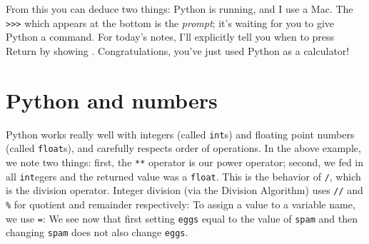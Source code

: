 \documentclass[m3380-lec-main.tex]{subfiles}
\begin{document}
From this you can deduce two things: Python is running, and I use a Mac. The \verb|>>>| which appears at the bottom is the \emph{prompt}; it's waiting for you to give Python a command. For today's notes, I'll explicitly tell you when to press Return by showing \car.
\smallskip\noindent
Congratulations, you've just used Python as a calculator! 


\section{Python and numbers}
Python works really well with integers (called \verb|int|s) and floating point numbers (called \verb|float|s), and carefully respects order of operations.
\smallskip\noindent
In the above example, we note two things: first, the \verb|**| operator is our power operator; second, we fed in all \verb|int|egers and the returned value was a \verb|float|. This is the behavior of \verb|/|, which is the division operator. Integer division (via the Division Algorithm) uses \verb|//| and \verb|%| for quotient and remainder respectively:
\smallskip\noindent
To assign a value to a variable name, we use \verb|=|:
\smallskip\noindent
We see now that first setting \verb|eggs| equal to the value of \verb|spam| and then changing \verb|spam| does not also change \verb|eggs|.
\end{document}
